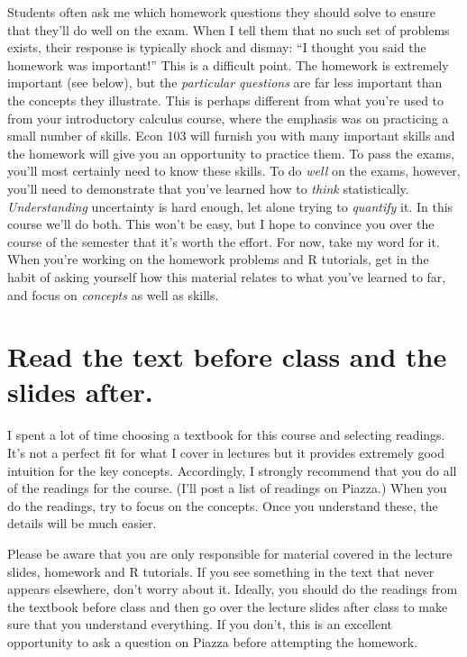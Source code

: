 \documentclass[12pt,letterpaper]{article}
\begin{document}
Students often ask me which homework questions they should solve to ensure that they'll do well on the exam. When I tell them that no such set of problems exists, their response is typically shock and dismay: ``I thought you said the homework was important!'' This is a difficult point. The homework is extremely important (see below), but the \emph{particular questions} are far less important than the concepts they illustrate. This is perhaps different from what you're used to from your introductory calculus course, where the emphasis was on practicing a small number of skills. Econ 103 will furnish you with many important skills and the homework will give you an opportunity to practice them. To pass the exams, you'll most certainly need to know these skills. To do \emph{well} on the exams, however, you'll need to demonstrate that you've learned how to \emph{think} statistically. \emph{Understanding} uncertainty is hard enough, let alone trying to \emph{quantify} it. In this course we'll do both. This won't be easy, but I hope to convince you over the course of the semester that it's worth the effort. For now, take my word for it. When you're working on the homework problems and R tutorials, get in the habit of asking yourself how this material relates to what you've learned to far, and focus on \emph{concepts} as well as skills.


\section{Read the text before class and the slides after.}
I spent a lot of time choosing a textbook for this course and selecting readings. It's not a perfect fit for what I cover in lectures but it provides extremely good intuition for the key concepts. Accordingly, I strongly recommend that you do all of the readings for the course. (I'll post a list of readings on Piazza.) When you do the readings, try to focus on the concepts. Once you understand these, the details will be much easier.

 Please be aware that you are only responsible for material covered in the lecture slides, homework and R tutorials. If you see something in the text that never appears elsewhere, don't worry about it. Ideally, you should do the readings from the textbook before class and then go over the lecture slides after class to make sure that you understand everything. If you don't, this is an excellent opportunity to ask a question on Piazza before attempting the homework. 
\end{document}

